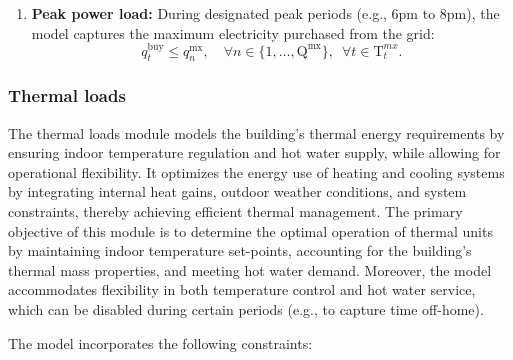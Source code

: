 \documentclass[11pt]{article}
\begin{document}
\begin{enumerate}
    \item \textbf{Peak power load:}
    During designated peak periods (e.g., 6pm to 8pm), the model captures the maximum electricity purchased from the grid:
    \[
    q^\text{buy}_t \leq q^\text{mx}_n, \quad \forall n \in \{1, \dots, \text{Q}^\text{mx}\}, \;\ \forall t \in \text{T}^{mx}_t.
    \]

\end{enumerate}

\subsubsection{Thermal loads}
\label{sec:tload}

The thermal loads module models the building’s thermal energy requirements by ensuring indoor temperature regulation and hot water supply, while allowing for operational flexibility. It optimizes the energy use of heating and cooling systems by integrating internal heat gains, outdoor weather conditions, and system constraints, thereby achieving efficient thermal management. The primary objective of this module is to determine the optimal operation of thermal units by maintaining indoor temperature set-points, accounting for the building's thermal mass properties, and meeting hot water demand. Moreover, the model accommodates flexibility in both temperature control and hot water service, which can be disabled during certain periods (e.g., to capture time off-home).

The model incorporates the following constraints:
\end{document}
